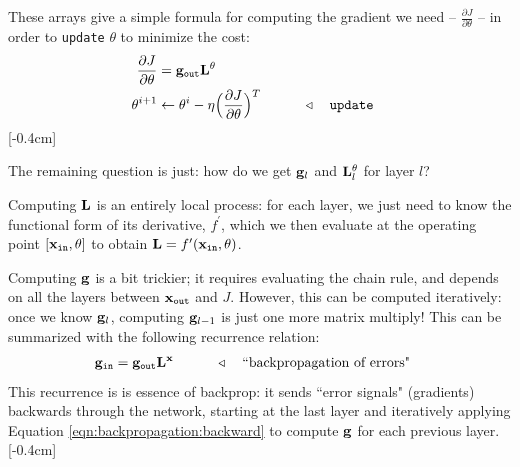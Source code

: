 These arrays give a simple formula for computing the gradient we need -- $\frac{\partial J}{\partial \theta}$ -- in order to \texttt{update} $\theta$ to minimize the cost:
\begin{align}
    \frac{\partial J}{\partial \theta} &= \mathbf{g}_{\texttt{out}}\mathbf{L}^{\theta}\\
    \theta^{i+1} &\leftarrow \theta^{i} - \eta \Big(\frac{\partial J}{\partial \theta}\Big)^T &&\quad\quad \triangleleft \quad \texttt{update} \label{eqn:backpropagation:djdtheta}
\end{align}
[-0.4cm]

The remaining question is just: how do we get $\mathbf{g}_l$ and $\mathbf{L}^{\theta}_l$ for layer $l$? 

Computing $\mathbf{L}$ is an entirely local process: for each layer, we just need to know the functional form of its derivative, $f^{\prime}$, which we then evaluate at the operating point $[\mathbf{x}_{\texttt{in}}, \theta]$ to obtain $\mathbf{L} = f^{\prime}(\mathbf{x}_{\texttt{in}},\theta)$.

Computing $\mathbf{g}$ is a bit trickier; it requires evaluating the chain rule, and depends on all the layers between $\mathbf{x}_{\texttt{out}}$ and $J$. However, this can be computed iteratively: once we know $\mathbf{g}_l$, computing $\mathbf{g}_{l-1}$ is just one more matrix multiply! This can be summarized with the following recurrence relation:
\begin{align}
    \mathbf{g}_{\texttt{in}} &= \mathbf{g}_{\texttt{out}}\mathbf{L}^{\mathbf{x}} &&\quad\quad \triangleleft \quad \text{``backpropagation of errors"} \label{eqn:backpropagation:backward}
\end{align}
This recurrence is is essence of backprop: it sends ``error signals" (gradients) backwards through the network, starting at the last layer and iteratively applying Equation \ref{eqn:backpropagation:backward} to
compute $\mathbf{g}$ for each previous layer.
[-0.4cm]

